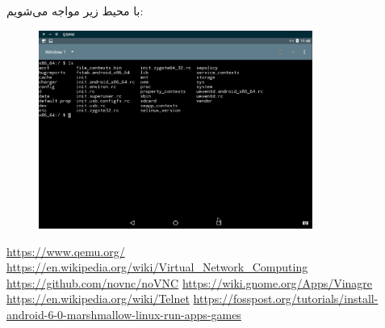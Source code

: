 \documentclass{article}
\begin{document}
با محیط زیر مواجه می‌شویم:

\newpage

\begin{figure}[h]
	\centering	
	\includegraphics[width = 0.8\textwidth]{images/install22.png}
\end{figure}

\begin{thebibliography}{9}

\latin
{}
\url{https://www.qemu.org/}
\url{https://en.wikipedia.org/wiki/Virtual_Network_Computing}
\url{https://github.com/novnc/noVNC}
\url{https://wiki.gnome.org/Apps/Vinagre}
\url{https://en.wikipedia.org/wiki/Telnet}
\url{https://fosspost.org/tutorials/install-android-6-0-marshmallow-linux-run-apps-games}
\end{thebibliography}
\end{document}
